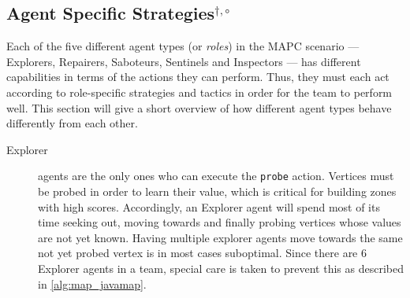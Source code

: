 \subsection[Agent Specific Strategies]{Agent Specific Strategies$^{\dagger,\circ}$}\label{alg:agentstrategies}
Each of the five different agent types (or \emph{roles}) in the MAPC scenario --- Explorers, Repairers, Saboteurs, Sentinels and Inspectors --- has different capabilities in terms of the actions they can perform.
Thus, they must each act according to role-specific strategies and tactics in order for the team to perform well.
This section will give a short overview of how different agent types behave differently from each other.
\begin{description}
    \item[Explorer] agents are the only ones who can execute the \texttt{probe} action.
        Vertices must be probed in order to learn their value, which is critical for building zones with high scores.
        Accordingly, an Explorer agent will spend most of its time seeking out, moving towards and finally probing vertices whose values are not yet known.
        Having multiple explorer agents move towards the same not yet probed vertex is in most cases suboptimal.
        Since there are 6 Explorer agents in a team, special care is taken to prevent this as described in \autoref{alg:map_javamap}.


\end{description}

